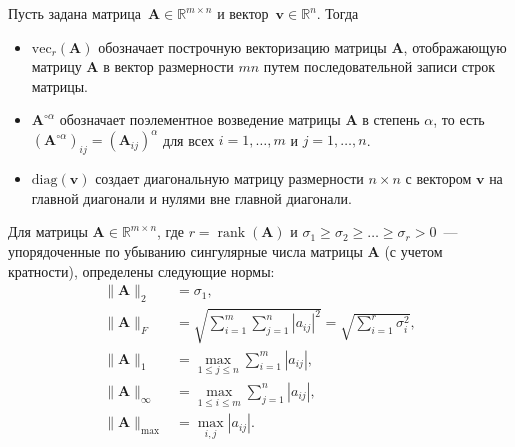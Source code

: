 \begin{definition}\label{def:vec_elem_ops}
    Пусть задана матрица~$\mathbf{A} \in \mathbb{R}^{m \times n}$ и вектор~$\mathbf{v} \in \mathbb{R}^{n}$. Тогда
    \begin{itemize}
        \item $\mathrm{vec}_r(\mathbf{A})$ обозначает построчную векторизацию матрицы $\mathbf{A}$, отображающую матрицу $\mathbf{A}$ в вектор размерности $mn$ путем последовательной записи строк матрицы.
        \item $\mathbf{A}^{\circ \alpha}$ обозначает поэлементное возведение матрицы $\mathbf{A}$ в степень $\alpha$, то есть $(\mathbf{A}^{\circ \alpha})_{ij} = (\mathbf{A}_{ij})^\alpha$ для всех $i = 1, \ldots, m$ и $j = 1, \ldots, n$.
        \item $\mathrm{diag}(\mathbf{v})$ создает диагональную матрицу размерности $n \times n$ с вектором $\mathbf{v}$ на главной диагонали и нулями вне главной диагонали.
    \end{itemize}
\end{definition}

\begin{definition}\label{def:matrix_norms}
    Для матрицы $\mathbf{A} \in \mathbb{R}^{m \times n}$, где $r = \operatorname{rank}(\mathbf{A})$ и $\sigma_1 \geq \sigma_2 \geq \ldots \geq \sigma_r > 0$~--- упорядоченные по убыванию сингулярные числа матрицы $\mathbf{A}$ (с учетом кратности), определены следующие нормы:
    \begin{align}
        \|\mathbf{A}\|_2 &= \sigma_1, \\
        \|\mathbf{A}\|_F &= \sqrt{\sum_{i=1}^m \sum_{j=1}^n |a_{ij}|^2} = \sqrt{\sum_{i=1}^r \sigma_i^2}, \\
        \|\mathbf{A}\|_1 &= \max_{1 \leq j \leq n} \sum_{i=1}^m |a_{ij}|,  \\
        \|\mathbf{A}\|_\infty &= \max_{1 \leq i \leq m} \sum_{j=1}^n |a_{ij}|, \\
        \|\mathbf{A}\|_{\max} &= \max_{i,j} |a_{ij}|.
    \end{align}
\end{definition}
